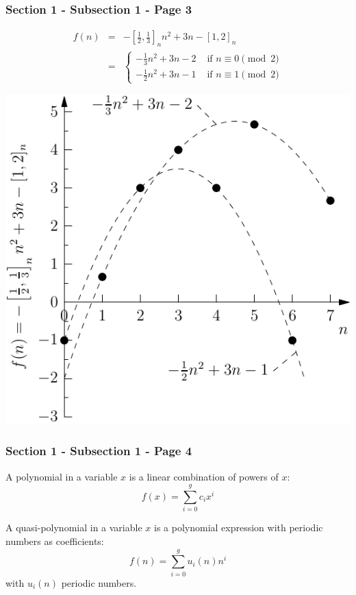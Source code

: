 \begin{frame}\frametitle{Section 1 - Subsection 1 - Page 3}
	\begin{example}
		\centering
		{
		$$
		\begin{array}{rcl}
			f(n)
			&=&
			-\left[\frac{1}{2},\frac{1}{3}\right]_n n^2
			+3n-[1,2]_n
			\\
			&=&
			\begin{cases}
				-\frac{1}{3} n^2 +3n-2
				& \text{ if $n\equiv 0 \pmod 2$} \\
				-\frac{1}{2} n^2 +3n-1
				& \text{ if $n\equiv 1 \pmod 2$}
			\end{cases}
		\end{array}
		$$
		\begin{minipage}{0.4\textwidth}
			\includegraphics[width=\textwidth]{images/ex2_quasi_polynomial.pdf}
		\end{minipage}
		}
	\end{example}
\end{frame}

\begin{frame}\frametitle{Section 1 - Subsection 1 - Page 4}
	\begin{definition}
		A polynomial in a variable $x$ is a linear combination of powers of $x$:
		$$
		f(x)=\sum_{i=0}^g c_i x^i
		$$
	\end{definition}
	\pause
	
	\begin{definition}
		A quasi-polynomial in a variable $x$ is a polynomial expression with periodic numbers as coefficients:
		$$
		f(n)=\sum_{i=0}^g u_i(n) n^i
		$$
		with $u_i(n)$ periodic numbers.
	\end{definition}
\end{frame}

